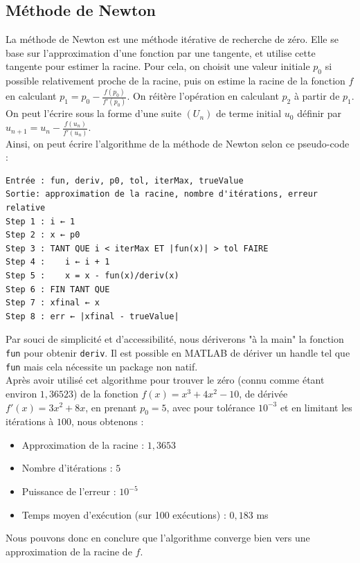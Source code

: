 \documentclass[12pt]{article}
\begin{document}
\subsection{Méthode de Newton}
\label{ref:newton}
\noindent La méthode de Newton est une méthode itérative de recherche de zéro. Elle se base sur l'approximation d'une fonction par une tangente, et utilise cette tangente pour estimer la racine. Pour cela, on choisit une valeur initiale $p_0$ si possible relativement proche de la racine, puis on estime la racine de la fonction $f$ en calculant $p_1=p_0-\frac{f(p_0)}{f'(p_0)}$. On réitère l'opération en calculant $p_2$ à partir de $p_1$. On peut l'écrire sous la forme d'une suite $(U_n)$ de terme initial $u_0$ définir par $u_{n+1}=u_n-\frac{f(u_n)}{f'(u_n)}$.\\
Ainsi, on peut écrire l'algorithme de la méthode de Newton selon ce pseudo-code :
\begin{verbatim}
Entrée : fun, deriv, p0, tol, iterMax, trueValue
Sortie: approximation de la racine, nombre d'itérations, erreur relative
Step 1 : i ← 1
Step 2 : x ← p0
Step 3 : TANT QUE i < iterMax ET |fun(x)| > tol FAIRE
Step 4 :    i ← i + 1
Step 5 :    x = x - fun(x)/deriv(x)
Step 6 : FIN TANT QUE
Step 7 : xfinal ← x
Step 8 : err ← |xfinal - trueValue|
\end{verbatim}
Par souci de simplicité et d'accessibilité, nous dériverons "à la main" la fonction \texttt{fun} pour obtenir \texttt{deriv}. Il est possible en MATLAB de dériver un handle tel que \texttt{fun} mais cela nécessite un package non natif.\\

\noindent Après avoir utilisé cet algorithme pour trouver le zéro (connu comme étant environ $1,36523$) de la fonction $f(x) = x^3 + 4x^2 -10$, de dérivée $f'(x)=3x^2+8x$, en prenant $p_0=5$, avec pour tolérance $10^{-3}$ et en limitant les itérations à $100$, nous obtenons :
\begin{itemize}
    \item Approximation de la racine : $1,3653$
    \item Nombre d'itérations : $5$
    \item Puissance de l'erreur : $10^{-5}$
    \item Temps moyen d'exécution (sur 100 exécutions) : $0,183$ ms
\end{itemize}
Nous pouvons donc en conclure que l'algorithme converge bien vers une approximation de la racine de $f$.

\end{document}
